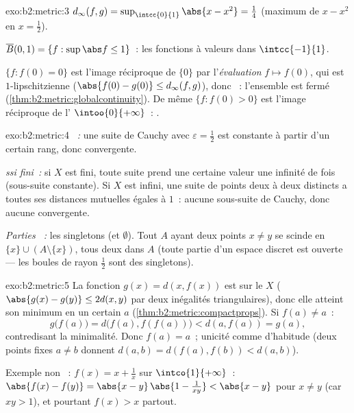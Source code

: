 \begin{solution}{exo:b2:metric:3}
$d_\infty(f, g) = \sup_{\intcc{0}{1}} \abs{x - x^2} = \frac14$
(maximum de $x - x^2$ en $x = \frac12$).

$\overline B(0, 1) = \{f : \sup\abs f \leq 1\}$~: les fonctions
 à valeurs dans $\intcc{-1}{1}$.

$\{f : f(0) = 0\}$ est l'image réciproque de $\{0\}$ par
l'\emph{évaluation} $f \mapsto f(0)$, qui est $1$-lipschitzienne
($\abs{f(0) - g(0)} \leq d_\infty(f,g)$), donc ~: l'ensemble
est fermé (\cref{thm:b2:metric:globalcontinuity}). De même $\{f :
f(0) > 0\}$ est l'image réciproque de l'
$\intoo{0}{+\infty}$~: .
\end{solution}

\begin{solution}{exo:b2:metric:4}
\emph{~:} une suite de Cauchy avec $\varepsilon = \frac12$ est
constante à partir d'un certain rang, donc convergente.

\emph{ ssi fini~:} si $X$ est fini, toute suite prend une
certaine valeur une infinité de fois (sous-suite constante). Si $X$
est infini, une suite de points deux à deux distincts a toutes ses
distances mutuelles égales à $1$~: aucune sous-suite de Cauchy, donc
aucune convergente.

\emph{Parties ~:} les singletons (et $\emptyset$). Tout $A$
ayant deux points $x \neq y$ se scinde en $\{x\} \cup (A
\setminus\{x\})$, tous deux  dans $A$ (toute partie d'un
espace discret est ouverte --- les boules de rayon $\frac12$ sont des
singletons).
\end{solution}

\begin{solution}{exo:b2:metric:5}
La fonction $g(x) = d(x, f(x))$ est  sur le  $X$
($\abs{g(x) - g(y)} \leq 2d(x,y)$ par deux inégalités
triangulaires), donc elle atteint son minimum en un certain $a$
(\cref{thm:b2:metric:compactprops}). Si $f(a) \neq a$~:
\[
g\bigl(f(a)\bigr) = d\bigl(f(a), f(f(a))\bigr) < d(a, f(a)) = g(a),
\]
contredisant la minimalité. Donc $f(a) = a$~; unicité comme
d'habitude (deux points fixes $a \neq b$ donnent $d(a,b) = d(f(a),
f(b)) < d(a,b)$).

Exemple non ~: $f(x) = x + \frac1x$ sur $\intco{1}{+\infty}$~:
$\abs{f(x) - f(y)} = \abs{x - y}\,\abs{1 - \frac{1}{xy}} < \abs{x -
y}$ pour $x \neq y$ (car $xy > 1$), et pourtant $f(x) > x$ partout.
\end{solution}


